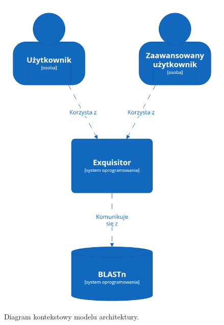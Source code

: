         \begin{figure}[!htb]
            \begin{center}
                \includegraphics[width=\textwidth]{tex/pictures/app/c4_system_context.png}
            \end{center}
            \caption{
                Diagram kontekstowy modelu architektury.
            }\label{Picture:App:C4:Context}
        \end{figure}

